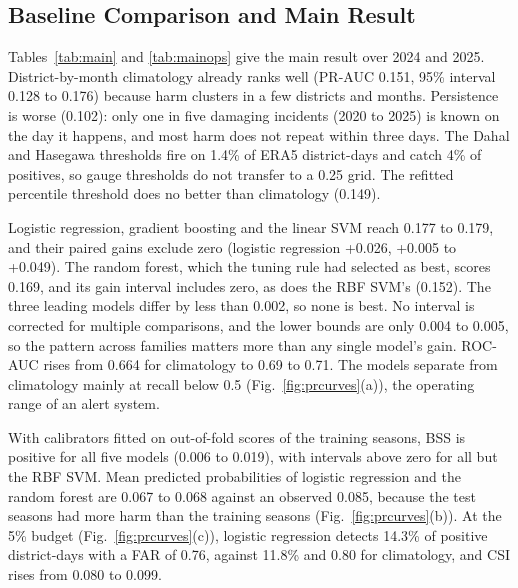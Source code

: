 \documentclass[conference]{IEEEtran}
\begin{document}
\subsection{Baseline Comparison and Main Result}
Tables~\ref{tab:main} and \ref{tab:mainops} give the main result over 2024 and 2025. District-by-month climatology already ranks well (PR-AUC 0.151, 95\% interval 0.128 to 0.176) because harm clusters in a few districts and months. Persistence is worse (0.102): only one in five damaging incidents (2020 to 2025) is known on the day it happens, and most harm does not repeat within three days. The Dahal and Hasegawa thresholds fire on 1.4\% of ERA5 district-days and catch 4\% of positives, so gauge thresholds do not transfer to a 0.25\textdegree{} grid. The refitted percentile threshold does no better than climatology (0.149).

Logistic regression, gradient boosting and the linear SVM reach 0.177 to 0.179, and their paired gains exclude zero (logistic regression +0.026, +0.005 to +0.049). The random forest, which the tuning rule had selected as best, scores 0.169, and its gain interval includes zero, as does the RBF SVM's (0.152). The three leading models differ by less than 0.002, so none is best. No interval is corrected for multiple comparisons, and the lower bounds are only 0.004 to 0.005, so the pattern across families matters more than any single model's gain. ROC-AUC rises from 0.664 for climatology to 0.69 to 0.71. The models separate from climatology mainly at recall below 0.5 (Fig.~\ref{fig:prcurves}(a)), the operating range of an alert system.

With calibrators fitted on out-of-fold scores of the training seasons, BSS is positive for all five models (0.006 to 0.019), with intervals above zero for all but the RBF SVM. Mean predicted probabilities of logistic regression and the random forest are 0.067 to 0.068 against an observed 0.085, because the test seasons had more harm than the training seasons (Fig.~\ref{fig:prcurves}(b)). At the 5\% budget (Fig.~\ref{fig:prcurves}(c)), logistic regression detects 14.3\% of positive district-days with a FAR of 0.76, against 11.8\% and 0.80 for climatology, and CSI rises from 0.080 to 0.099.

\begin{table}[t]
\caption{PR-AUC on 2024 to 2025 under the expanding window (per-season mean; 32,494 district-days, base rate 0.085) and paired difference from climatology (Clim.), with 95\% season-stratified weekly block-bootstrap intervals. Persist.: persistence; D\&H thr., ERA5 thr.: Dahal and Hasegawa and refitted thresholds; LR, RF, HGB, SVM-L, SVM-RBF: the five models; LR, set B: logistic regression with the perfect three-day rain forecast.}
\label{tab:main}
\centering
\scriptsize
\setlength{\tabcolsep}{4pt}

\end{table}
\end{document}
